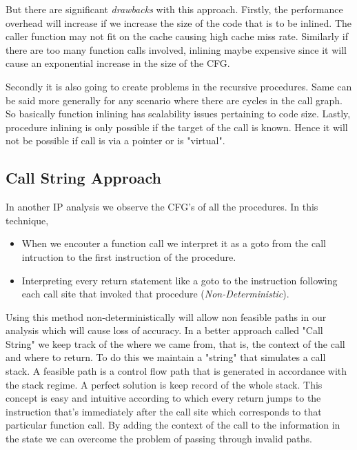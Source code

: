\documentclass[12pt,oneside]{book}
\begin{document}
But there are significant \textit{drawbacks} with this approach. Firstly, the performance overhead will increase if we increase the size of the code that is to be inlined. The caller function may not fit on the cache causing high cache miss rate. Similarly if there are too many function calls involved, inlining maybe expensive since it will cause an exponential increase in the size of the CFG.

Secondly it is also going to create problems in the recursive procedures. Same can be said more generally for any scenario where there are cycles in the call graph. So basically function inlining has scalability issues pertaining to code size. Lastly, procedure inlining is only possible if the target of the call is known. Hence it will not be possible if call is via a pointer or is "virtual".


\subsection {Call String Approach}
In another IP analysis we observe the CFG's of all the procedures. In this technique,
\begin{itemize}
\item When we encouter a function call we interpret it as a goto from the call intruction to the first instruction of the procedure.
\item Interpreting every return statement like a goto to the instruction following each call site that invoked that procedure (\textit{Non-Deterministic}).
\end{itemize}
Using this method non-deterministically will allow non feasible paths in our analysis which will cause loss of accuracy. In a better approach called "Call String" we keep track of the where we came from, that is, the context of the call and where to return. To do this we maintain a "string" that simulates a call stack. A feasible path is a control flow path that is generated in accordance with the stack regime. A perfect solution is keep record of the whole stack. This concept is easy and intuitive according to which every return jumps to the instruction that's immediately after the call site which corresponds to that particular function call. By adding the context of the call to the information in the state we can overcome the problem of passing through invalid paths.\\
\end{document}
